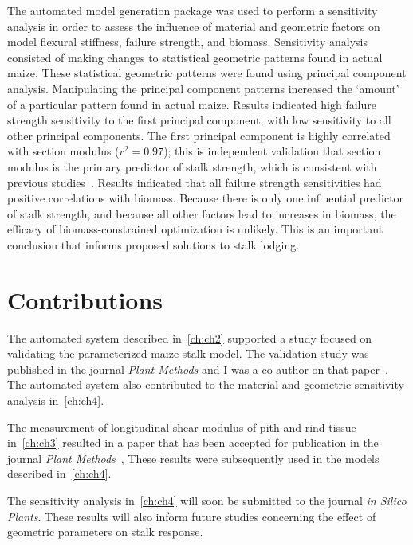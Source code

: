 The automated model generation package was used to perform a sensitivity analysis in order to assess the influence of material and geometric factors on model flexural stiffness, failure strength, and biomass. Sensitivity analysis consisted of making changes to statistical geometric patterns found in actual maize. These statistical geometric patterns were found using principal component analysis. Manipulating the principal component patterns increased the ‘amount’ of a particular pattern found in actual maize. Results indicated high failure strength sensitivity to the first principal component, with low sensitivity to all other principal components. The first principal component is highly correlated with section modulus (${r^{2}=0.97}$);  this is independent validation that section modulus is the primary predictor of stalk strength, which is consistent with previous studies~. Results indicated that all failure strength sensitivities had positive correlations with biomass. Because there is only one influential predictor of stalk strength, and because all other factors lead to increases in biomass, the efficacy of biomass-constrained optimization is unlikely. This is an important conclusion that informs proposed solutions to stalk lodging.

\section{Contributions}
\label{sec:contributions_to_scientific_literature}
The automated system described in~\cref{ch:ch2} supported a study focused on validating the parameterized maize stalk model.  The validation study was published in the journal \textit{Plant Methods} and I was a co-author on that paper~. The automated system  also contributed to the material and geometric sensitivity analysis in~\cref{ch:ch4}.

The measurement of longitudinal shear modulus of pith and rind tissue in~\cref{ch:ch3} resulted in a paper that has been accepted for publication in the journal \textit{Plant Methods}~, These results were subsequently used in the models described in~\cref{ch:ch4}.

The sensitivity analysis in~\cref{ch:ch4} will soon be submitted to the journal \textit{in Silico Plants}. These results will also inform future studies concerning the effect of geometric parameters on stalk response.

